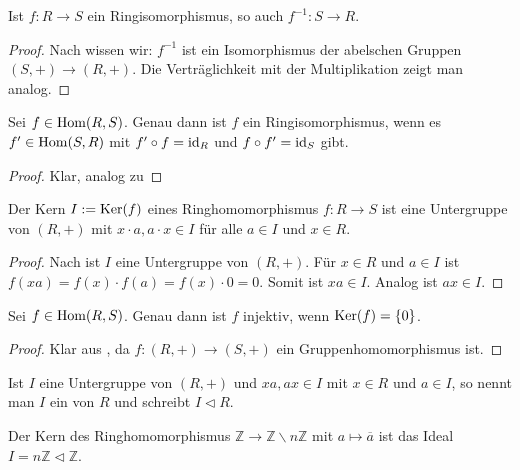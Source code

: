 \begin{lemma}
	Ist $f:R\to S$ ein Ringisomorphismus, so auch $f^{-1}: S\to R$.
\end{lemma}
\begin{proof}
	Nach  wissen wir: $f^{-1}$ ist ein Isomorphismus der abelschen Gruppen $(S,+)\to (R,+)$. Die Verträglichkeit 
	mit der Multiplikation zeigt man analog.
\end{proof}

\begin{proposition}
	Sei $f\in \operatorname{Hom}(R,S)$. Genau dann ist $f$ ein Ringisomorphismus, wenn es $f'\in \operatorname{Hom}(S,R)$ mit $f'\circ 
	f=\operatorname{id}_R$ und $f\circ f'=\operatorname{id}_S$ gibt.
\end{proposition}
\begin{proof}
	Klar, analog zu 
\end{proof}

\begin{lemma}
	Der Kern $I:=\operatorname{Ker}(f)$ eines Ringhomomorphismus $f:R\to S$ ist eine Untergruppe von $(R,+)$ mit 
	$x\cdot a, a\cdot x \in I$ für alle $a\in I$ und $x\in R$.
\end{lemma}
\begin{proof}
	Nach  ist $I$ eine Untergruppe von $(R,+)$. Für $x\in R$ und $a \in I$ ist $f(xa)=f(x)\cdot 
	f(a)=f(x)\cdot 0=0$. Somit ist $xa\in I$. Analog ist $ax\in I$.
\end{proof}

\begin{proposition}
	Sei $f\in \operatorname{Hom}(R,S)$. Genau dann ist $f$ injektiv, wenn $\operatorname{Ker}(f)=\{0\}$.
\end{proposition}
\begin{proof}
	Klar aus , da $f:(R,+)\to (S,+)$ ein Gruppenhomomorphismus ist.
\end{proof}

\begin{definition}[Ideal]
	Ist $I$ eine Untergruppe von $(R,+)$ und $xa,ax\in I$ mit $x\in R$ und $a\in I$, so nennt 
	man $I$ ein  von $R$ und schreibt $I\vartriangleleft R$.
\end{definition}

\begin{example}
	Der Kern des Ringhomomorphismus $\mathbb Z\to \mathbb Z\backslash n\mathbb Z$ mit $a\mapsto 
	\overline a$ ist das Ideal $I=n\mathbb Z\vartriangleleft \mathbb Z$.
\end{example}